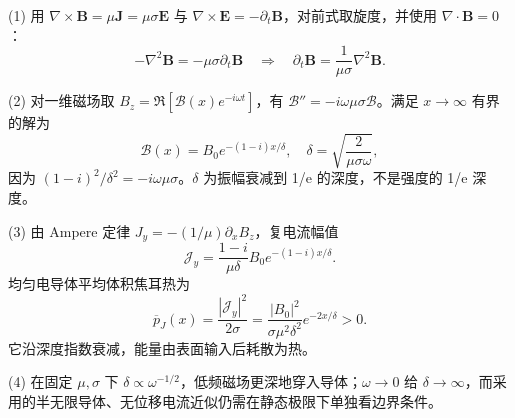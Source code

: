 (1) 用 \(\nabla\times\boldsymbol B=\mu\boldsymbol J=\mu\sigma\boldsymbol E\) 与 \(\nabla\times\boldsymbol E=-\partial_t\boldsymbol B\)，对前式取旋度，并使用 \(\nabla\cdot\boldsymbol B=0\)：
\[
-\nabla^2\boldsymbol B=-\mu\sigma\partial_t\boldsymbol B
\quad\Rightarrow\quad \partial_t\boldsymbol B=\frac1{\mu\sigma}\nabla^2\boldsymbol B.
\]

(2) 对一维磁场取 \(B_z=\Re[\mathcal B(x)e^{-i\omega t}]\)，有 \(\mathcal B''=-i\omega\mu\sigma\mathcal B\)。满足 \(x\to\infty\) 有界的解为
\[
\mathcal B(x)=B_0e^{-(1-i)x/\delta},\quad
\delta=\sqrt{\frac2{\mu\sigma\omega}},
\]
因为 \((1-i)^2/\delta^2=-i\omega\mu\sigma\)。\(\delta \) 为振幅衰减到 1/e 的深度，不是强度的 1/e 深度。

(3) 由 Ampere 定律 \(J_y=-(1/\mu)\partial_x B_z\)，复电流幅值
\[
\mathcal J_y=\frac{1-i}{\mu\delta}B_0e^{-(1-i)x/\delta}.
\]
均匀电导体平均体积焦耳热为
\[
\overline p_J(x)=\frac{|\mathcal J_y|^2}{2\sigma}
=\frac{|B_0|^2}{\sigma\mu^2\delta^2}e^{-2x/\delta}>0.
\]
它沿深度指数衰减，能量由表面输入后耗散为热。

(4) 在固定 \(\mu,\sigma\) 下 \(\delta\propto\omega^{-1/2}\)，低频磁场更深地穿入导体；\(\omega\to0\) 给 \(\delta \to \infty \)，而采用的半无限导体、无位移电流近似仍需在静态极限下单独看边界条件。
